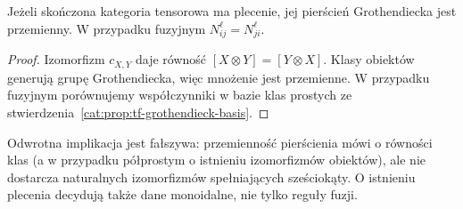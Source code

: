 \begin{wniosek}\label{cat:cor:tf-braided-grothendieck}
Jeżeli skończona kategoria tensorowa ma plecenie, jej pierścień Grothendiecka jest przemienny. W przypadku fuzyjnym $N_{ij}^{\ell}=N_{ji}^{\ell}$.
\end{wniosek}
\begin{proof}
Izomorfizm $c_{X,Y}$ daje równość $[X\otimes Y]=[Y\otimes X]$. Klasy obiektów generują grupę Grothendiecka, więc mnożenie jest przemienne. W przypadku fuzyjnym porównujemy współczynniki w bazie klas prostych ze stwierdzenia~\ref{cat:prop:tf-grothendieck-basis}.
\end{proof}

Odwrotna implikacja jest fałszywa: przemienność pierścienia mówi o równości klas (a w przypadku półprostym o istnieniu izomorfizmów obiektów), ale nie dostarcza naturalnych izomorfizmów spełniających sześciokąty. O istnieniu plecenia decydują także dane monoidalne, nie tylko reguły fuzji.

